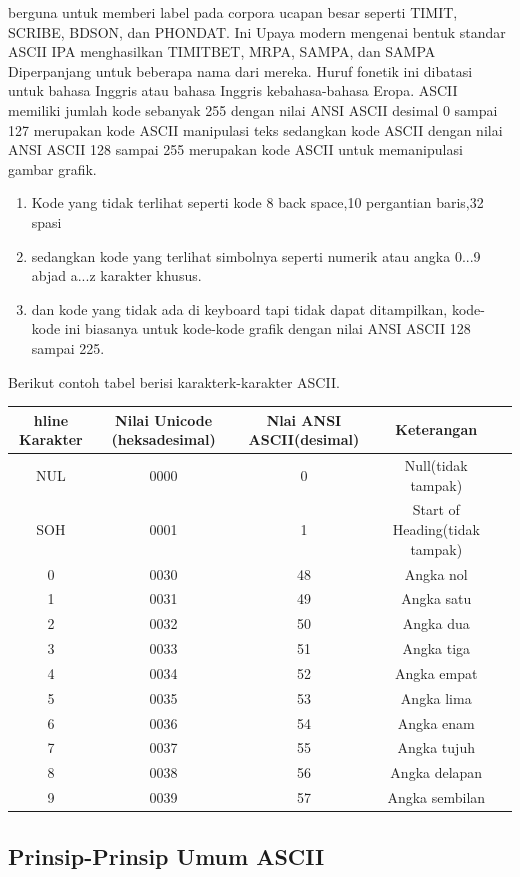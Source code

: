 	berguna untuk memberi label pada corpora ucapan besar seperti TIMIT, SCRIBE, BDSON, dan PHONDAT. Ini
	Upaya modern mengenai bentuk standar ASCII IPA menghasilkan TIMITBET, MRPA, SAMPA, dan
	SAMPA Diperpanjang untuk beberapa nama dari mereka. Huruf fonetik ini dibatasi untuk bahasa Inggris atau bahasa Inggris kebahasa-bahasa Eropa.
	ASCII memiliki jumlah kode sebanyak 255 dengan nilai ANSI ASCII desimal 0 sampai 127 merupakan kode ASCII manipulasi teks sedangkan kode ASCII dengan nilai ANSI ASCII 128 sampai 255 merupakan kode ASCII untuk memanipulasi gambar grafik.
	\begin{enumerate}
		\item Kode yang tidak terlihat seperti kode 8 back space,10 pergantian baris,32 spasi
		\item sedangkan kode yang terlihat simbolnya seperti numerik atau angka 0...9 abjad a...z karakter khusus.
		\item dan kode yang tidak ada di keyboard tapi tidak dapat ditampilkan, kode-kode ini biasanya untuk kode-kode grafik dengan nilai ANSI ASCII 128 sampai 225.
  \end{enumerate}

	Berikut contoh tabel berisi karakterk-karakter ASCII.
\begin{table}[H]
\begin{tabular}{|c|c|c|c|c|}
hline
Karakter & Nilai Unicode (heksadesimal) & Nlai ANSI ASCII(desimal) & Keterangan\\
\hline
NUL & 0000 & 0 & Null(tidak tampak)\\
SOH & 0001 & 1 & Start of Heading(tidak tampak)\\
0 & 0030 & 48 & Angka nol\\
1 & 0031 & 49 & Angka satu\\
2 & 0032 & 50 & Angka dua\\
3 & 0033 & 51 & Angka tiga\\
4 & 0034 & 52 & Angka empat\\
5 & 0035 & 53 & Angka lima\\
6 & 0036 & 54 & Angka enam\\
7 & 0037 & 55 & Angka tujuh\\
8 & 0038 & 56 & Angka delapan\\
9 & 0039 & 57 & Angka sembilan\\
\hline
\end{tabular}
\end{table}

\subsection{Prinsip-Prinsip Umum ASCII}

